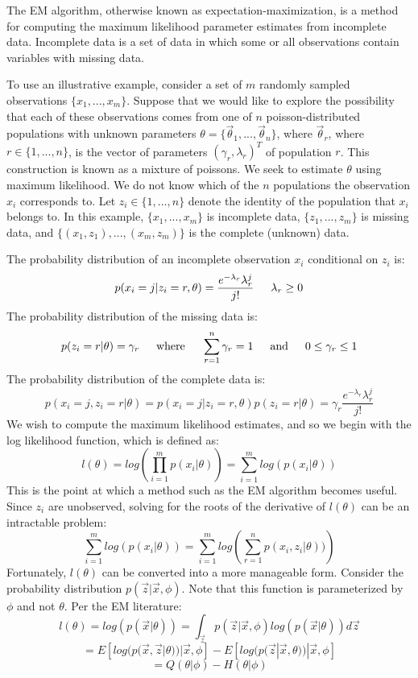 \documentclass[letter,12pt]{article}
\begin{document}
The EM algorithm, otherwise known as expectation-maximization, is a method for computing the maximum likelihood parameter estimates from incomplete data.  Incomplete data is a set of data in which some or all observations contain variables with missing data.  

To use an illustrative example, consider a set of $m$ randomly sampled observations $\{x_1,...,x_m\}$.  Suppose that we would like to explore the possibility that each of these observations comes from one of $n$ poisson-distributed populations with unknown parameters $\theta=\{\vec{\theta}_1,...,\vec{\theta}_n\}$, where $\vec{\theta}_r$, where $r \in \{1,...,n\}$, is the vector of parameters $(\gamma_r,\lambda_r)^T$ of population $r$.  This construction is known as a mixture of poissons.  We seek to estimate $\theta$ using maximum likelihood.  We do not know which of the $n$ populations the observation $x_i$ corresponds to.  Let $z_i \in \{1,...,n\}$ denote the identity of the population that $x_i$ belongs to.  In this example, $\{x_1,...,x_m\}$ is incomplete data, $\{z_1,...,z_m\}$ is missing data, and $\{(x_1,z_1),...,(x_m,z_m)\}$ is the complete (unknown) data.

The probability distribution of an incomplete observation $x_i$ conditional on $z_i$ is:
\[
p(x_i=j|z_i=r,\theta) = \frac{e^{-\lambda_r}\lambda_r^{j}}{j!}  
\indent
\lambda_r \geq 0
\]
The probability distribution of the missing data is:
\[
p(z_i=r|\theta) = \gamma_r
\indent
\text{where}
\indent 
\sum_{r=1}^{n}\gamma_r = 1
\indent
\text{and}
\indent 
0 \leq \gamma_r \leq 1
\]
The probability distribution of the complete data is:
\begin{equation} \label{eq_constraint}
p(x_i=j,z_i=r|\theta) 
= p(x_i=j|z_i=r,\theta)p(z_i=r|\theta) = \gamma_r\frac{e^{-\lambda_r}\lambda_r^{j}}{j!}
\end{equation}
We wish to compute the maximum likelihood estimates, and so we begin with the log likelihood function, which is defined as:
\[
l(\theta) = log(\prod_{i=1}^{m}p(x_i|\theta)) = \sum_{i=1}^{m} log(p(x_i|\theta))
\]
This is the point at which a method such as the EM algorithm becomes useful.  Since $z_i$ are unobserved, solving for the roots of the derivative of $l(\theta)$ can be an intractable problem:
\[
\sum_{i=1}^{m} log(p(x_i|\theta)) = \sum_{i=1}^{m} log\left(\sum_{r=1}^{n}p(x_i,z_i|\theta))\right)
\]
Fortunately, $l(\theta)$ can be converted into a more manageable form.  Consider the probability distribution $p(\vec{z}|\vec{x},\phi)$.  Note that this function is parameterized by $\phi$ and not $\theta$.  Per the EM literature:
\[
l(\theta) = log(p(\vec{x}|\theta)) 
= \int_{\vec{z}}p(\vec{z}|\vec{x},\phi)log(p(\vec{x}|\theta))d\vec{z}
\]
\[
=
E[log(p(\vec{x},\vec{z}|\theta))|\vec{x},\phi]
-
E[log(p(\vec{z}|\vec{x},\theta))|\vec{x},\phi]
\]
\begin{equation} \label{eq:QH}
=Q(\theta|\phi)
-H(\theta|\phi)
\end{equation}
\end{document}
